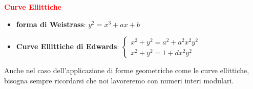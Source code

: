 \begin{flushleft}
    \newpage

    \textcolor{red}{\textbf{Curve Ellittiche}}
    \begin{itemize}[nosep]
        \item \textbf{forma di Weistrass}: $y^2 = x^3 + ax + b$
        \item \textbf{Curve Ellittiche di Edwards}:
        \begin{math}
            \begin{cases}
                x^2 + y^2 = a^2 + a^2x^2y^2 \\
                x^2 + y^2 = 1 + dx^2y^2
            \end{cases}
        \end{math}
    \end{itemize}

    \medskip

    Anche nel caso dell'applicazione di forme geometriche come le curve ellittiche, bisogna sempre ricordarsi che noi lavoreremo con numeri interi modulari.

    \medskip


\end{flushleft}
